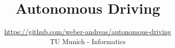 


\title{Autonomous Driving}
\author{\url{https://github.com/weber-andreas/autonomous-driving} \\ TU Munich - Informatics}
\date{\the\year}
\pagestyle{plain}



\maketitle

\begin{multicols*}{2} 
\raggedcolumns %





\end{multicols*}

